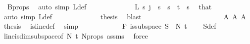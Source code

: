 \begin{isabellebody}
\ {}\ B{\isacharunderscore}{\kern0pt}props\ \isamarkupfalse%
\ {\isacharparenleft}{\kern0pt}auto\ simp{\isacharcolon}{\kern0pt}\ L{\isacharprime}{\kern0pt}{\isacharunderscore}{\kern0pt}def{\isacharparenright}{\kern0pt}\isanewline
\ \ \ \ \ \ \ \ \ \ \isamarkupfalse%
\ \isamarkupfalse%
\ {\isachardoublequoteopen}L{\isacharprime}{\kern0pt}\ s\ j\ {\isacharequal}{\kern0pt}\ s{\isachardoublequoteclose}\ \ {\isachardoublequoteopen}s\ {\isacharless}{\kern0pt}\ t{\isacharplus}{\kern0pt}{}{\isachardoublequoteclose}\ \ s\ \isamarkupfalse%
\ that\ \isamarkupfalse%
\ {\isacharparenleft}{\kern0pt}auto\ simp{\isacharcolon}{\kern0pt}\ L{\isacharprime}{\kern0pt}{\isacharunderscore}{\kern0pt}def{\isacharparenright}{\kern0pt}\isanewline
\ \ \ \ \ \ \ \ \ \ \isamarkupfalse%
\ \isamarkupfalse%
\ {\isacharquery}{\kern0pt}thesis\ \isamarkupfalse%
\ blast\isanewline
\ \ \ \ \ \ \ \ \isamarkupfalse%
\isanewline
\ \ \ \ \ \ \isamarkupfalse%
\isanewline
\ \ \ \ \ \ \isamarkupfalse%
\ A{}\ A{}\ A{}\ \isamarkupfalse%
\ {\isacharquery}{\kern0pt}thesis\ \isamarkupfalse%
\ is{\isacharunderscore}{\kern0pt}line{\isacharunderscore}{\kern0pt}def\ \isamarkupfalse%
\ simp\isanewline
\ \ \ \ \isamarkupfalse%
\isanewline
\ \ \ \ \isamarkupfalse%
\ \isamarkupfalse%
\ F{}{\isacharcolon}{\kern0pt}\ {\isachardoublequoteopen}is{\isacharunderscore}{\kern0pt}subspace\ S{}\ {}\ N{\isacharprime}{\kern0pt}\ {\isacharparenleft}{\kern0pt}t\ {\isacharplus}{\kern0pt}\ {}{\isacharparenright}{\kern0pt}{\isachardoublequoteclose}\ \isamarkupfalse%
\ S{}{\isacharunderscore}{\kern0pt}def\ \isamarkupfalse%
\ line{\isacharunderscore}{\kern0pt}is{\isacharunderscore}{\kern0pt}dim{}{\isacharunderscore}{\kern0pt}subspace{\isacharbrackleft}{\kern0pt}of\ {\isachardoublequoteopen}N{\isacharprime}{\kern0pt}{\isachardoublequoteclose}\ {\isachardoublequoteopen}t{\isacharplus}{\kern0pt}{}{\isachardoublequoteclose}{\isacharbrackright}{\kern0pt}\ N{\isacharprime}{\kern0pt}{\isacharunderscore}{\kern0pt}props\ assms{\isacharparenleft}{\kern0pt}{}{\isacharparenright}{\kern0pt}\ \isamarkupfalse%
\ force\isanewline

\end{isabellebody}
